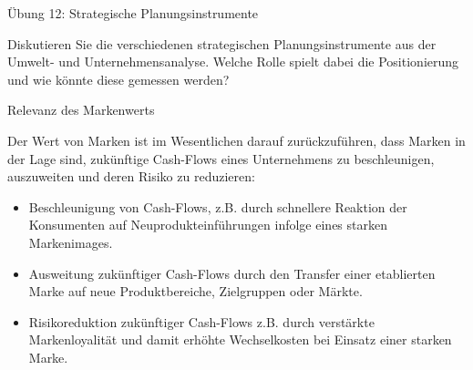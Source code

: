 \documentclass[12pt,ngerman,a4paper,ignorenonframetext,]{beamer}
\providecommand{\tightlist}{%
  \setlength{\itemsep}{0pt}\setlength{\parskip}{0pt}}
\begin{document}
\begin{frame}{Übung 12: Strategische Planungsinstrumente}
\protect\hypertarget{ubung-12-strategische-planungsinstrumente}{}

Diskutieren Sie die verschiedenen strategischen Planungsinstrumente aus
der Umwelt- und Unternehmensanalyse. Welche Rolle spielt dabei die
Positionierung und wie könnte diese gemessen werden?

\end{frame}

\begin{frame}{Relevanz des Markenwerts}
\protect\hypertarget{relevanz-des-markenwerts}{}

Der Wert von Marken ist im Wesentlichen darauf zurückzuführen, dass
Marken in der Lage sind, zukünftige Cash-Flows eines Unternehmens zu
beschleunigen, auszuweiten und deren Risiko zu reduzieren:

\begin{itemize}
\tightlist
\item
  Beschleunigung von Cash-Flows, \mbox{z.\thinspace{}B.}\xspace{} durch
  schnellere Reaktion der Konsumenten auf Neuprodukteinführungen infolge
  eines starken Markenimages.
\item
  Ausweitung zukünftiger Cash-Flows durch den Transfer einer etablierten
  Marke auf neue Produktbereiche, Zielgruppen oder Märkte.
\item
  Risikoreduktion zukünftiger Cash-Flows
  \mbox{z.\thinspace{}B.}\xspace{} durch verstärkte Markenloyalität und
  damit erhöhte Wechselkosten bei Einsatz einer starken Marke.
\end{itemize}

\end{frame}
\end{document}
